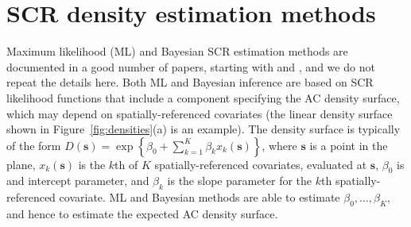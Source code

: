 \documentclass[10pt,a4paper]{article}
\begin{document}



\section{SCR density estimation methods} \label{secrmethods}

Maximum likelihood (ML) and Bayesian SCR estimation methods are documented in a good number of papers, starting with \cite{Borchers+Efford:08} and \cite{Royle+Young:08}, and we do not repeat the details here. Both ML and Bayesian inference are based on SCR likelihood functions that include a component specifying the AC density surface, which may depend on spatially-referenced covariates (the linear density surface shown in Figure~\ref{fig:densities}(a) is an example). The density surface is typically of the form $D(\bm{s})=\exp\left\{\beta_0 + \sum_{k=1}^K\beta_kx_k(\bm{s})\right\}$, where $\bm{s}$ is a point in the plane, $x_k(\bm{s})$ is the $k$th of $K$ spatially-referenced covariates, evaluated at $\bm{s}$, $\beta_0$ is and intercept parameter, and $\beta_k$ is the slope parameter for the $k$th spatially-referenced covariate. ML and Bayesian methods are able to estimate $\beta_0,\ldots,\beta_K$, and hence to estimate the expected AC density surface. 
\end{document}
